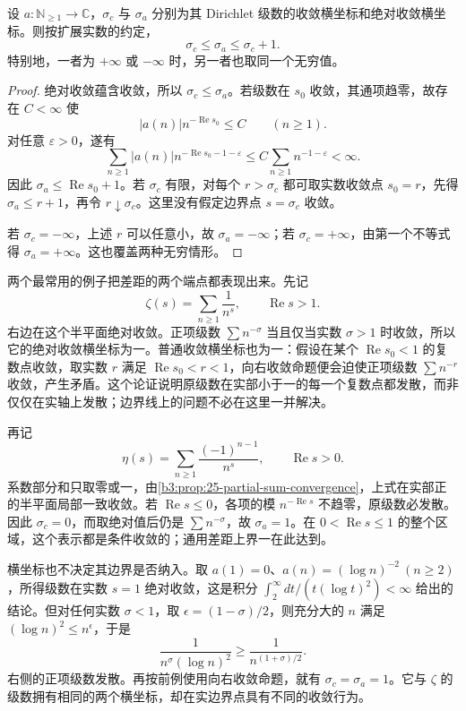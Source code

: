 \begin{proposition}[两个横坐标之间的差距]\label{b3:prop:25-abscissa-gap}
设 \(a:\mathbb N_{\ge1}\to\mathbb C\)，\(\sigma_c\) 与 \(\sigma_a\) 分别为其 Dirichlet 级数的收敛横坐标和绝对收敛横坐标。则按扩展实数的约定，
\[
 \sigma_c\le\sigma_a\le\sigma_c+1.
\]
特别地，一者为 \(+\infty\) 或 \(-\infty\) 时，另一者也取同一个无穷值。
\end{proposition}
\begin{proof}
绝对收敛蕴含收敛，所以 \(\sigma_c\le\sigma_a\)。若级数在 \(s_0\) 收敛，其通项趋零，故存在 \(C<\infty\) 使
\[
 |a(n)|n^{-\operatorname{Re}s_0}\le C\qquad(n\ge1).
\]
对任意 \(\varepsilon>0\)，遂有
\[
 \sum_{n\ge1}|a(n)|n^{-\operatorname{Re}s_0-1-\varepsilon}
 \le C\sum_{n\ge1}n^{-1-\varepsilon}<\infty.
\]
因此 \(\sigma_a\le\operatorname{Re}s_0+1\)。若 \(\sigma_c\) 有限，对每个 \(r>\sigma_c\) 都可取实数收敛点 \(s_0=r\)，先得 \(\sigma_a\le r+1\)，再令 \(r\downarrow\sigma_c\)。这里没有假定边界点 \(s=\sigma_c\) 收敛。

若 \(\sigma_c=-\infty\)，上述 \(r\) 可以任意小，故 \(\sigma_a=-\infty\)；若 \(\sigma_c=+\infty\)，由第一个不等式得 \(\sigma_a=+\infty\)。这也覆盖两种无穷情形。
\end{proof}

两个最常用的例子把差距的两个端点都表现出来。先记
\begin{equation}\label{b3:eq:25-zeta-series-definition}
 \zeta(s)=\sum_{n\ge1}\frac1{n^s},\qquad\operatorname{Re}s>1.
\end{equation}
右边在这个半平面绝对收敛。正项级数 \(\sum n^{-\sigma}\) 当且仅当实数 \(\sigma>1\) 时收敛，所以它的绝对收敛横坐标为一。普通收敛横坐标也为一：假设在某个 \(\operatorname{Re}s_0<1\) 的复数点收敛，取实数 \(r\) 满足 \(\operatorname{Re}s_0<r<1\)，向右收敛命题便会迫使正项级数 \(\sum n^{-r}\) 收敛，产生矛盾。这个论证说明原级数在实部小于一的每一个复数点都发散，而非仅仅在实轴上发散；边界线上的问题不必在这里一并解决。

再记
\[
 \eta(s)=\sum_{n\ge1}\frac{(-1)^{n-1}}{n^s},
 \qquad\operatorname{Re}s>0.
\]
系数部分和只取零或一，由\cref{b3:prop:25-partial-sum-convergence}，上式在实部正的半平面局部一致收敛。若 \(\operatorname{Re}s\le0\)，各项的模 \(n^{-\operatorname{Re}s}\) 不趋零，原级数必发散。因此 \(\sigma_c=0\)，而取绝对值后仍是 \(\sum n^{-\sigma}\)，故 \(\sigma_a=1\)。在 \(0<\operatorname{Re}s\le1\) 的整个区域，这个表示都是条件收敛的；通用差距上界一在此达到。

横坐标也不决定其边界是否纳入。取 \(a(1)=0\)、\(a(n)=(\log n)^{-2}\ (n\ge2)\)，所得级数在实数 \(s=1\) 绝对收敛，这是积分 \(\int_2^{\infty}dt/(t(\log t)^2)<\infty\) 给出的结论。但对任何实数 \(\sigma<1\)，取 \(\epsilon=(1-\sigma)/2\)，则充分大的 \(n\) 满足 \((\log n)^2\le n^{\epsilon}\)，于是
\[
 \frac1{n^{\sigma}(\log n)^2}\ge\frac1{n^{(1+\sigma)/2}}.
\]
右侧的正项级数发散。再按前例使用向右收敛命题，就有 \(\sigma_c=\sigma_a=1\)。它与 \(\zeta\) 的级数拥有相同的两个横坐标，却在实边界点具有不同的收敛行为。

